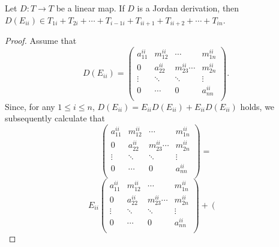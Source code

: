 \documentclass[10pt,a4paper]{amsart}
\begin{document}
\begin{lemma}\label{1} Let $D : T \longrightarrow T$ be a linear map. If  $D$ is a Jordan derivation, then
$D(E_{ii})\in T_{1i} + T_{2i}+\cdots + T_{i-1i} + T_{ii+1}+T_{ii+2} + \cdots +T_{in}$.
 \end{lemma}

 \begin{proof} Assume that $$D(E_{ii})=\left(
                               \begin{array}{ccccc}
                                 a_{11}^{ii} &m_{12}^{ii}&\cdots &  m_{1n}^{ii} \\
                                 0 & a_{22}^{ii}&m_{23}^{ii}\cdots &m_{2n}^{ii}\\
                                   \vdots &\ddots&\ddots&\vdots  \\
                                   0 &\cdots &0& a_{nn}^{ii}\\
                               \end{array}
                             \right).$$ Since, for any $1\leq i\leq n$, $D(E_{ii})=E_{ii}D(E_{ii})+E_{ii}D(E_{ii})$ holds, we subsequently calculate that
                             $$\left(
                               \begin{array}{ccccc}
                                 a_{11}^{ii} &m_{12}^{ii}&\cdots &  m_{1n}^{ii} \\
                                 0 & a_{22}^{ii}&m_{23}^{ii}\cdots &m_{2n}^{ii}\\
                                   \vdots &\ddots&\ddots&\vdots  \\
                                   0 &\cdots &0& a_{nn}^{ii}\\
                               \end{array}
                             \right)=$$$$E_{ii}\left(
                               \begin{array}{ccccc}
                                 a_{11}^{ii} &m_{12}^{ii}&\cdots &  m_{1n}^{ii} \\
                                 0 & a_{22}^{ii}&m_{23}^{ii}\cdots &m_{2n}^{ii}\\
                                   \vdots &\ddots&\ddots&\vdots  \\
                                   0 &\cdots &0& a_{nn}^{ii}\\
                               \end{array}
                             \right)+\left(
                               \begin{array}{ccccc}

\end{array}$$
\end{proof}
\end{document}
